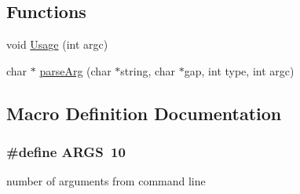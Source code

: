 \subsection*{Functions}
\begin{DoxyCompactItemize}
\item 
void \hyperlink{optjrParam__helper_8hh_a071ae424a27c67719a722878e9f2ab9a}{Usage} (int argc)
\item 
char $\ast$ \hyperlink{optjrParam__helper_8hh_ac15f519b8531039fbfc3380f9de89580}{parse\-Arg} (char $\ast$string, char $\ast$gap, int type, int argc)
\end{DoxyCompactItemize}


\subsection{Macro Definition Documentation}
\hypertarget{optjrParam__helper_8hh_aff1b09d6630c6c0942f78171e74c1b9d}{
\subsubsection[{A\-R\-G\-S}]{\setlength{\rightskip}{0pt plus 5cm}\#define A\-R\-G\-S~10}}\label{optjrParam__helper_8hh_aff1b09d6630c6c0942f78171e74c1b9d}


number of arguments from command line 

